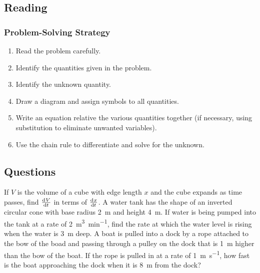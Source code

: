 


\subsection*{Reading}
\subsubsection*{Problem-Solving Strategy}
\begin{enumerate}
  \item Read the problem carefully.
  \item Identify the quantities given in the problem.
  \item Identify the unknown quantity.
  \item Draw a diagram and assign symbols to all quantities.
  \item Write an equation relative the various quantities together (if necessary, using
        substitution to eliminate unwanted variables).
  \item Use the chain rule to differentiate and solve for the unknown.
\end{enumerate}

\subsection*{Questions}
\begin{questions}
  \question If $ V $ is the volume of a cube with edge length $ x $ and the cube expands as time passes,
            find $ \od{V}{t} $ in terms of $ \od{x}{t} $.
  \question A water tank has the shape of an inverted circular cone with base radius \SI{2}{\metre}
            and height \SI{4}{\metre}. If water is being pumped into the tank at a rate of \SI{2}{\metre\cubed\per\minute},
            find the rate at which the water level is rising when the water is \SI{3}{\metre} deep.
  \question A boat is pulled into a dock by a rope attached to the bow of the boad and passing through a pulley on
            the dock that is \SI{1}{\metre} higher than the bow of the boat. If the rope is pulled in at a rate
            of \SI{1}{\metre\per\second}, how fast is the boat approaching the dock when it is \SI{8}{\metre} from the dock?
\end{questions}

